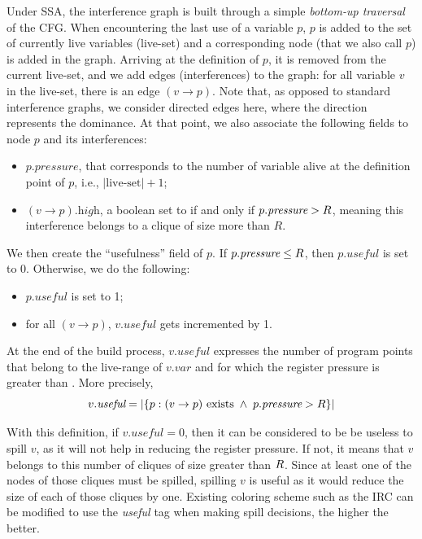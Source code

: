 {Under SSA, the interference graph is built through a simple \emph{bottom-up traversal} of the CFG.
When encountering the last use of a variable $p$, $p$ is added to the set of currently live variables (live-set) and a corresponding node (that we also call $p$) is added in the graph.
Arriving at the definition of $p$, it is removed from the current live-set, and we add edges (interferences) to the graph:
for all variable $v$ in the live-set, there is an edge $(v\to p)$.
Note that, as opposed to standard interference graphs, we consider directed edges here, where the direction represents the dominance.
At that point, we also associate the following fields to node $p$ and its interferences: 
\begin{itemize}
  \item $p.\textit{pressure}$, that corresponds to the number of variable alive at the definition point of $p$, i.e., $|\textrm{live-set}| + 1$;
  \item $(v\to p).\textit{high}$, a boolean set to \true if and only if $p.\textit{pressure}>R$, meaning this interference belongs to a clique of size more than $R$.
\end{itemize}

We then create the ``usefulness'' field of $p$. If $p.\textit{pressure} \leq R$, then $p.\textit{useful}$ is set to 0. Otherwise, we do the following:
\begin{itemize}
  \item $p.\textit{useful}$ is set to 1;
  \item for all $(v\to p)$, $v.\textit{useful}$ gets incremented by 1.
\end{itemize}

At the end of the build process, $v.\textit{useful}$ expresses the number of program points that belong to the live-range of $v.\textit{var}$ and for which the register pressure is greater than \regs. 
More precisely,
%
$$v.\textit{useful}=\left|\lbrace p : (v\to p)\ \textrm{exists}\; \wedge\; p.\textit{pressure}>R  \rbrace\right|$$

With this definition, if $v.\textit{useful}=0$, then it can be considered to be be useless to spill $v$, as it will not help in reducing the register pressure.
If not, it means that $v$ belongs to this number of cliques of size greater than $R$.
Since at least one of the nodes of those cliques must be spilled, spilling $v$ is useful as it would reduce the size of each of those cliques by one.
Existing coloring scheme such as the IRC can be modified to use the \emph{useful} tag when making spill decisions, the higher the better.


}

